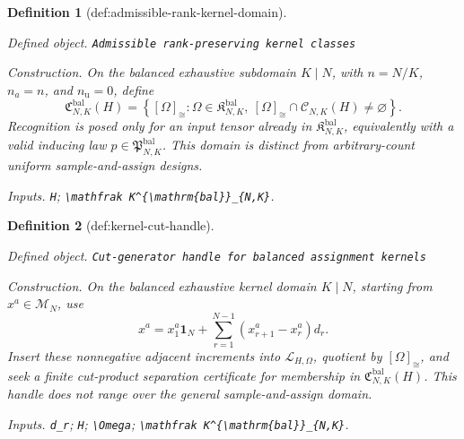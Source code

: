 \documentclass{article}
\newtheorem{definition}{Definition}
\begin{document}
\begin{definition}[def:admissible-rank-kernel-domain]\label{def:admissible-rank-kernel-domain}
\par\smallskip\noindent\emph{Defined object.} \texttt{Admissible rank-\allowbreak{}preserving kernel classes}
\par\smallskip\noindent\emph{Construction.} On the balanced exhaustive subdomain \(K\mid N\), with \(n=N/K\), \(n_a=n\), and \(n_{\mathrm u}=0\), define
\[
\mathfrak C^{\mathrm{bal}}_{N,K}(H)=\left\{[\Omega]_{\cong}:\Omega\in\mathfrak K^{\mathrm{bal}}_{N,K},\ [\Omega]_{\cong}\cap\mathcal C_{N,K}(H)\neq\varnothing\right\}.
\]
Recognition is posed only for an input tensor already in \(\mathfrak K^{\mathrm{bal}}_{N,K}\), equivalently with a valid inducing law \(p\in\mathfrak P^{\mathrm{bal}}_{N,K}\). This domain is distinct from arbitrary-count uniform sample-and-assign designs.
\par\smallskip\noindent\emph{Inputs.} \texttt{H}; \texttt{\textbackslash{}\allowbreak{}mathfrak K\textasciicircum{}\{\textbackslash{}\allowbreak{}mathrm\{bal\}\allowbreak{}\}\allowbreak{}\_\allowbreak{}\{N,\allowbreak{}K\}\allowbreak{}}.
\end{definition}

\begin{definition}[def:kernel-cut-handle]\label{def:kernel-cut-handle}
\par\smallskip\noindent\emph{Defined object.} \texttt{Cut-\allowbreak{}generator handle for balanced assignment kernels}
\par\smallskip\noindent\emph{Construction.} On the balanced exhaustive kernel domain \(K\mid N\), starting from \(x^a\in\mathcal M_N\), use
\[
x^a=x^a_1\mathbf 1_N+\sum_{r=1}^{N-1}(x^a_{r+1}-x^a_r)d_r.
\]
Insert these nonnegative adjacent increments into \(\mathscr L_{H,\Omega}\), quotient by \([\Omega]_{\cong}\), and seek a finite cut-product separation certificate for membership in \(\mathfrak C^{\mathrm{bal}}_{N,K}(H)\). This handle does not range over the general sample-and-assign domain.
\par\smallskip\noindent\emph{Inputs.} \texttt{d\_\allowbreak{}r}; \texttt{H}; \texttt{\textbackslash{}\allowbreak{}Omega}; \texttt{\textbackslash{}\allowbreak{}mathfrak K\textasciicircum{}\{\textbackslash{}\allowbreak{}mathrm\{bal\}\allowbreak{}\}\allowbreak{}\_\allowbreak{}\{N,\allowbreak{}K\}\allowbreak{}}.
\end{definition}
\end{document}
